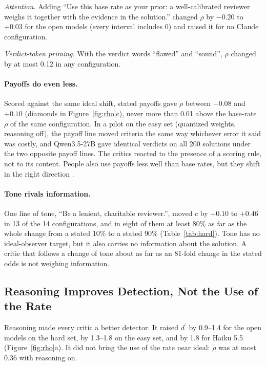 \documentclass[letterpaper]{article} %
\newcommand{\dprime}{d^{\prime}}
\begin{document}
\emph{Attention.} Adding ``Use this base rate as your prior: a well-calibrated reviewer weighs it together with the evidence in the solution.'' changed $\rho$ by $-0.20$ to $+0.03$ for the open models (every interval includes 0) and raised it for no Claude configuration.

\emph{Verdict-token priming.} With the verdict words ``flawed'' and ``sound'', $\rho$ changed by at most 0.12 in any configuration.

\paragraph{Payoffs do even less.} Scored against the same ideal shift, stated payoffs gave $\rho$ between $-0.08$ and $+0.10$ (diamonds in Figure~\ref{fig:rho}c), never more than 0.01 above the base-rate $\rho$ of the same configuration. In a pilot on the easy set (quantized weights, reasoning off), the payoff line moved criteria the same way whichever error it said was costly, and Qwen3.5-27B gave identical verdicts on all 200 solutions under the two opposite payoff lines. The critics reacted to the presence of a scoring rule, not to its content. People also use payoffs less well than base rates, but they shift in the right direction \citep{bohil2001category,maddox2002toward}.

\paragraph{Tone rivals information.} One line of tone, ``Be a lenient, charitable reviewer.'', moved $c$ by $+0.10$ to $+0.46$ in 13 of the 14 configurations, and in eight of them at least 80\% as far as the whole change from a stated 10\% to a stated 90\% (Table~\ref{tab:hard}). Tone has no ideal-observer target, but it also carries no information about the solution. A critic that follows a change of tone about as far as an 81-fold change in the stated odds is not weighing information.

\subsection{Reasoning Improves Detection, Not the Use of the Rate}
\label{sec:reasoning}

Reasoning made every critic a better detector. It raised $\dprime$ by 0.9--1.4 for the open models on the hard set, by 1.3--1.8 on the easy set, and by 1.8 for Haiku 5.5 (Figure~\ref{fig:rho}a). It did not bring the use of the rate near ideal: $\rho$ was at most 0.36 with reasoning on.
\end{document}
